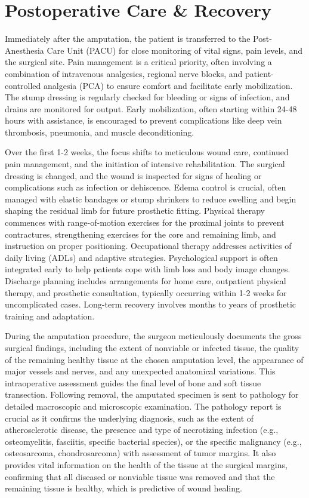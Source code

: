 \section*{Postoperative Care \& Recovery}
Immediately after the amputation, the patient is transferred to the Post-Anesthesia Care Unit (PACU) for close monitoring of vital signs, pain levels, and the surgical site. Pain management is a critical priority, often involving a combination of intravenous analgesics, regional nerve blocks, and patient-controlled analgesia (PCA) to ensure comfort and facilitate early mobilization. The stump dressing is regularly checked for bleeding or signs of infection, and drains are monitored for output. Early mobilization, often starting within 24-48 hours with assistance, is encouraged to prevent complications like deep vein thrombosis, pneumonia, and muscle deconditioning.

Over the first 1-2 weeks, the focus shifts to meticulous wound care, continued pain management, and the initiation of intensive rehabilitation. The surgical dressing is changed, and the wound is inspected for signs of healing or complications such as infection or dehiscence. Edema control is crucial, often managed with elastic bandages or stump shrinkers to reduce swelling and begin shaping the residual limb for future prosthetic fitting. Physical therapy commences with range-of-motion exercises for the proximal joints to prevent contractures, strengthening exercises for the core and remaining limb, and instruction on proper positioning. Occupational therapy addresses activities of daily living (ADLs) and adaptive strategies. Psychological support is often integrated early to help patients cope with limb loss and body image changes. Discharge planning includes arrangements for home care, outpatient physical therapy, and prosthetic consultation, typically occurring within 1-2 weeks for uncomplicated cases. Long-term recovery involves months to years of prosthetic training and adaptation.

During the amputation procedure, the surgeon meticulously documents the gross surgical findings, including the extent of nonviable or infected tissue, the quality of the remaining healthy tissue at the chosen amputation level, the appearance of major vessels and nerves, and any unexpected anatomical variations. This intraoperative assessment guides the final level of bone and soft tissue transection. Following removal, the amputated specimen is sent to pathology for detailed macroscopic and microscopic examination. The pathology report is crucial as it confirms the underlying diagnosis, such as the extent of atherosclerotic disease, the presence and type of necrotizing infection (e.g., osteomyelitis, fasciitis, specific bacterial species), or the specific malignancy (e.g., osteosarcoma, chondrosarcoma) with assessment of tumor margins. It also provides vital information on the health of the tissue at the surgical margins, confirming that all diseased or nonviable tissue was removed and that the remaining tissue is healthy, which is predictive of wound healing.

